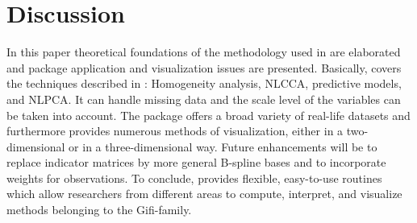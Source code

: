\documentclass[article]{jss1}
\begin{document}
\section{Discussion}
In this paper theoretical foundations of the methodology used in  are elaborated and package application and visualization issues are presented. Basically,  covers the techniques described in \citet{Gifi:90}: Homogeneity analysis, NLCCA, predictive models, and NLPCA. It can handle missing data and the scale level of the variables can be taken into account. The package offers a broad variety of real-life datasets and furthermore provides numerous methods of visualization, either in a two-dimensional or in a three-dimensional way. Future enhancements will be to replace indicator matrices by more general B-spline bases and to incorporate weights for observations. To conclude,  provides flexible, easy-to-use routines which allow researchers from different areas to compute, interpret, and visualize methods belonging to the Gifi-family. 


\end{document}
